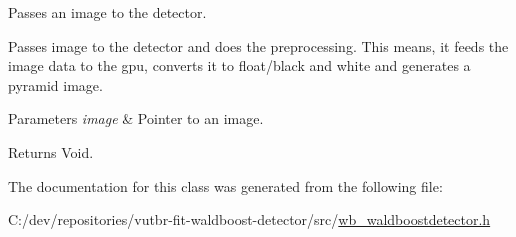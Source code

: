 Passes an image to the detector. 

Passes image to the detector and does the preprocessing. This means, it feeds the image data to the gpu, converts it to float/black and white and generates a pyramid image.


\begin{DoxyParams}{Parameters}
{\em image} & Pointer to an image. \\
\hline
\end{DoxyParams}
\begin{DoxyReturn}{Returns}
Void. 
\end{DoxyReturn}


The documentation for this class was generated from the following file\+:\begin{DoxyCompactItemize}
\item 
C\+:/dev/repositories/vutbr-\/fit-\/waldboost-\/detector/src/\hyperlink{wb__waldboostdetector_8h}{wb\+\_\+waldboostdetector.\+h}\end{DoxyCompactItemize}
